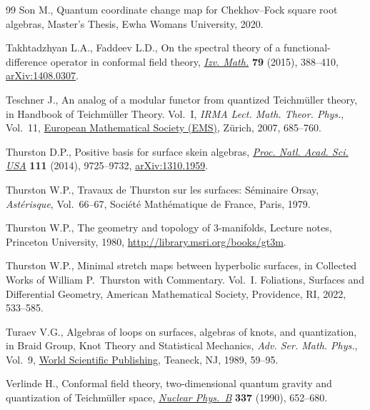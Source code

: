 \documentclass[10pt,a4paper]{amsart}
\numberwithin{equation}{section}
\theoremstyle{definition}
\begin{document}
\begin{thebibliography}{99}
Son M., Quantum coordinate change map for {C}hekhov--{F}ock square root
 algebras, {M}aster's Thesis, Ewha Womans University, 2020.

Takhtadzhyan L.A., Faddeev L.D., On the spectral theory of a
 functional-difference operator in conformal field theory,
 \href{https://doi.org/10.1070/IM2015v079n02ABEH002747}{\textit{Izv. Math.}}
 \textbf{79} (2015), 388--410,
 \href{http://arxiv.org/abs/1408.0307}{arXiv:1408.0307}.

Teschner J., An analog of a modular functor from quantized {T}eichm\"{u}ller
 theory, in Handbook of {T}eichm\"{u}ller Theory. {V}ol.~{I}, \textit{IRMA
 Lect. Math. Theor. Phys.}, Vol.~11,
 \href{https://doi.org/10.4171/029-1/17}{European Mathematical Society (EMS)},
 Z\"{u}rich, 2007, 685--760.

Thurston D.P., Positive basis for surface skein algebras,
 \href{https://doi.org/10.1073/pnas.1313070111}{\textit{Proc. Natl. Acad. Sci.
 USA}} \textbf{111} (2014), 9725--9732,
 \href{http://arxiv.org/abs/1310.1959}{arXiv:1310.1959}.

Thurston W.P., Travaux de {T}hurston sur les surfaces: {S}\'{e}minaire {O}rsay,
 \textit{Ast\'{e}risque}, Vol.~66--67, Soci\'{e}t\'{e} Math\'{e}matique de
 France, Paris, 1979.

Thurston W.P., The geometry and topology of $3$-manifolds, {L}ecture notes,
 Princeton University, 1980, \url{http://library.msri.org/books/gt3m}.

Thurston W.P., Minimal stretch maps between hyperbolic surfaces, in Collected
 Works of {W}illiam {P}.~{T}hurston with Commentary. {V}ol.~{I}. {F}oliations,
 Surfaces and Differential Geometry, American Mathematical Society,
 Providence, RI, 2022, 533--585.

Turaev V.G., Algebras of loops on surfaces, algebras of knots, and
 quantization, in Braid Group, Knot Theory and Statistical Mechanics,
 \textit{Adv. Ser. Math. Phys.}, Vol.~9,
 \href{https://doi.org/10.1142/9789812798350_0003}{World Scientific
 Publishing}, Teaneck, NJ, 1989, 59--95.

Verlinde H., Conformal field theory, two-dimensional quantum gravity and
 quantization of {T}eichm\"{u}ller space,
 \href{https://doi.org/10.1016/0550-3213(90)90510-K}{\textit{Nuclear Phys.~B}}
 \textbf{337} (1990), 652--680.

\end{thebibliography}
\end{document}
